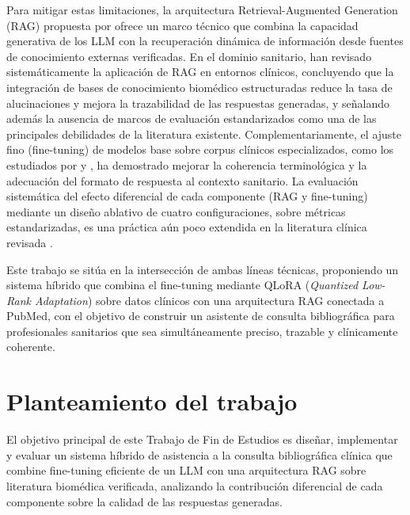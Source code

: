 \documentclass[11pt,a4paper,spanish]{book}
\numberwithin{equation}{chapter}
\numberwithin{figure}{chapter}
\begin{document}
Para mitigar estas limitaciones, la arquitectura Retrieval-Augmented Generation (RAG) propuesta por \cite{lewis_retrieval-augmented_2021} ofrece un marco técnico que combina la capacidad generativa de los LLM con la recuperación dinámica de información desde fuentes de conocimiento externas verificadas. En el dominio sanitario, \cite{amugongo_retrieval_2025} han revisado sistemáticamente la aplicación de RAG en entornos clínicos, concluyendo que la integración de bases de conocimiento biomédico estructuradas reduce la tasa de alucinaciones y mejora la trazabilidad de las respuestas generadas, y señalando además la ausencia de marcos de evaluación estandarizados como una de las principales debilidades de la literatura existente. Complementariamente, el ajuste fino (fine-tuning) de modelos base sobre corpus clínicos especializados, como los estudiados por \cite{lee_biobert_2020} y \cite{alsentzer_publicly_2019}, ha demostrado mejorar la coherencia terminológica y la adecuación del formato de respuesta al contexto sanitario. La evaluación sistemática del efecto diferencial de cada componente (RAG y fine-tuning) mediante un diseño ablativo de cuatro configuraciones, sobre métricas estandarizadas, es una práctica aún poco extendida en la literatura clínica revisada \cite{amugongo_retrieval_2025}.

Este trabajo se sitúa en la intersección de ambas líneas técnicas, proponiendo un sistema híbrido que combina el fine-tuning mediante QLoRA (\textit{Quantized Low-Rank Adaptation}) sobre datos clínicos con una arquitectura RAG conectada a PubMed, con el objetivo de construir un asistente de consulta bibliográfica para profesionales sanitarios que sea simultáneamente preciso, trazable y clínicamente coherente.

\section{Planteamiento del trabajo}
El objetivo principal de este Trabajo de Fin de Estudios es diseñar, implementar y evaluar un sistema híbrido de asistencia a la consulta bibliográfica clínica que combine fine-tuning eficiente de un LLM con una arquitectura RAG sobre literatura biomédica verificada, analizando la contribución diferencial de cada componente sobre la calidad de las respuestas generadas.
\end{document}
